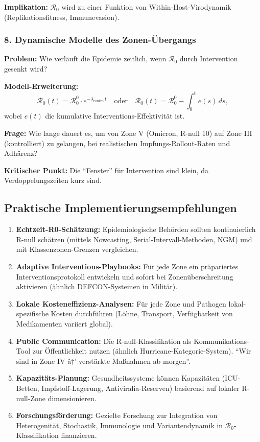 ﻿\documentclass[a4paper,12pt,twoside]{article}
\theoremstyle{definition}
\begin{document}
\textbf{Implikation:} $\mathcal{R}_0$ wird zu einer Funktion von Within-Host-Virodynamik (Replikationsfitness, Immunevasion).

\subsubsection{8. Dynamische Modelle des Zonen-Übergangs}

\textbf{Problem:} Wie verläuft die Epidemie zeitlich, wenn $\mathcal{R}_0$ durch Intervention gesenkt wird?

\textbf{Modell-Erweiterung:}
\[
\mathcal{R}_0(t) = \mathcal{R}_0^0 \cdot e^{-\lambda_{\text{control}} t} \quad \text{oder} \quad \mathcal{R}_0(t) = \mathcal{R}_0^0 - \int_0^t e(s) \, ds,
\]
wobei $e(t)$ die kumulative Interventions-Effektivität ist.

\textbf{Frage:} Wie lange dauert es, um von Zone V (Omicron, R-null 10) auf Zone III (kontrolliert) zu gelangen, bei realistischen Impfungs-Rollout-Raten und Adhärenz?

\textbf{Kritischer Punkt:} Die ``Fenster'' für Intervention sind klein, da Verdoppelungszeiten kurz sind.

\subsection{Praktische Implementierungsempfehlungen}

\begin{enumerate}

\item \textbf{Echtzeit-R0-Schätzung:} Epidemiologische Behörden sollten kontinuierlich R-null schätzen (mittels Nowcasting, Serial-Intervall-Methoden, NGM) und mit Klassenzonen-Grenzen vergleichen.

\item \textbf{Adaptive Interventions-Playbooks:} Für jede Zone ein präpariertes Interventionsprotokoll entwickeln und sofort bei Zonenüberschreitung aktivieren (ähnlich DEFCON-Systemen in Militär).

\item \textbf{Lokale Kosteneffizienz-Analysen:} Für jede Zone und Pathogen lokal-spezifische Kosten durchführen (Löhne, Transport, Verfügbarkeit von Medikamenten variiert global).

\item \textbf{Public Communication:} Die R-null-Klassifikation als Kommunikations-Tool zur Öffentlichkeit nutzen (ähnlich Hurricane-Kategorie-System). ``Wir sind in Zone IV â†’ verstärkte Maßnahmen ab morgen''.

\item \textbf{Kapazitäts-Planung:} Gesundheitssysteme können Kapazitäten (ICU-Betten, Impfstoff-Lagerung, Antiviralia-Reserven) basierend auf lokaler R-null-Zone dimensionieren.

\item \textbf{Forschungsförderung:} Gezielte Forschung zur Integration von Heterogenität, Stochastik, Immunologie und Variantendynamik in $\mathcal{R}_0$-Klassifikation finanzieren.

\end{enumerate}
\end{document}
